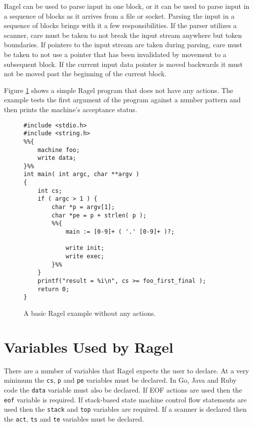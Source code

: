 \documentclass[letterpaper,11pt,oneside]{book}
\newcommand{\verbspace}{\vspace{10pt}}
\begin{document}
Ragel can be used to parse input in one block, or it can be used to parse input
in a sequence of blocks as it arrives from a file or socket.  Parsing the input
in a sequence of blocks brings with it a few responsibilities. If the parser
utilizes a scanner, care must be taken to not break the input stream anywhere
but token boundaries.  If pointers to the input stream are taken during
parsing, care must be taken to not use a pointer that has been invalidated by
movement to a subsequent block.  If the current input data pointer is moved
backwards it must not be moved past the beginning of the current block.

Figure \ref{basic-example} shows a simple Ragel program that does not have any
actions. The example tests the first argument of the program against a number
pattern and then prints the machine's acceptance status.

\begin{figure}
\small
\begin{verbatim}
#include <stdio.h>
#include <string.h>
%%{
    machine foo;
    write data;
}%%
int main( int argc, char **argv )
{
    int cs;
    if ( argc > 1 ) {
        char *p = argv[1];
        char *pe = p + strlen( p );
        %%{ 
            main := [0-9]+ ( '.' [0-9]+ )?;

            write init;
            write exec;
        }%%
    }
    printf("result = %i\n", cs >= foo_first_final );
    return 0;
}
\end{verbatim}
\verbspace
\caption{A basic Ragel example without any actions.
}
\label{basic-example}
\end{figure}

\section{Variables Used by Ragel}

There are a number of variables that Ragel expects the user to declare. At a
very minimum the \verb|cs|, \verb|p| and \verb|pe| variables must be declared.
In Go, Java and Ruby code the \verb|data| variable must also be declared. If
EOF actions are used then the \verb|eof| variable is required. If
stack-based state machine control flow statements are used then the
\verb|stack| and \verb|top| variables are required. If a scanner is declared
then the \verb|act|, \verb|ts| and \verb|te| variables must be
declared.
\end{document}
